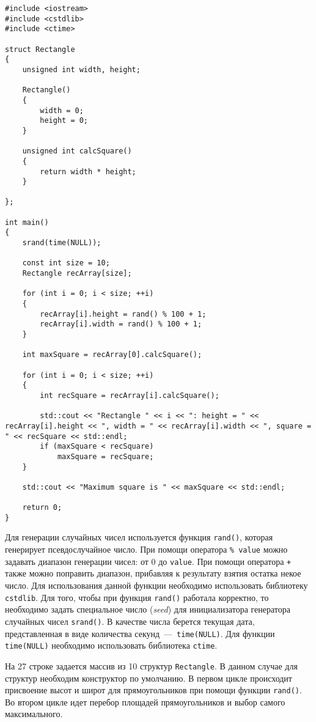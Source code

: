 \begin{lstlisting}
#include <iostream>
#include <cstdlib>
#include <ctime>

struct Rectangle
{
    unsigned int width, height;

    Rectangle()
    {
    	width = 0;
    	height = 0;
    }

    unsigned int calcSquare()
    {
    	return width * height;
    }

};

int main()
{
    srand(time(NULL));

    const int size = 10;
    Rectangle recArray[size];

    for (int i = 0; i < size; ++i)
    {
    	recArray[i].height = rand() % 100 + 1;
    	recArray[i].width = rand() % 100 + 1;
    }

    int maxSquare = recArray[0].calcSquare();

    for (int i = 0; i < size; ++i)
    {
    	int recSquare = recArray[i].calcSquare();

    	std::cout << "Rectangle " << i << ": height = " << recArray[i].height << ", width = " << recArray[i].width << ", square = " << recSquare << std::endl;
    	if (maxSquare < recSquare)
    		maxSquare = recSquare;
    }

    std::cout << "Maximum square is " << maxSquare << std::endl;

    return 0;
}
\end{lstlisting}

Для генерации случайных чисел используется функция \lstinline|rand()|, которая генерирует псевдослучайное число. При помощи оператора \lstinline|% value| можно задавать диапазон генерации чисел: от 0 до \lstinline|value|. При помощи оператора \lstinline|+| также можно поправить диапазон, прибавляя к результату взятия остатка некое число. Для использования данной функции необходимо использовать библиотеку \lstinline|cstdlib|. Для того, чтобы при функция \lstinline|rand()| работала корректно, то необходимо задать специальное число (\emph{seed}) для инициализатора генератора случайных чисел \lstinline|srand()|. В качестве числа берется текущая дата, представленная в виде количества секунд~---~\lstinline|time(NULL)|. Для функции \lstinline|time(NULL)| необходимо использовать библиотека \lstinline|ctime|.

На 27 строке задается массив из 10 структур \lstinline|Rectangle|. В данном случае для структур необходим конструктор по умолчанию. В первом цикле происходит присвоение высот и широт для прямоугольников при помощи функции \lstinline|rand()|. Во втором цикле идет перебор площадей прямоугольников и выбор самого максимального.  